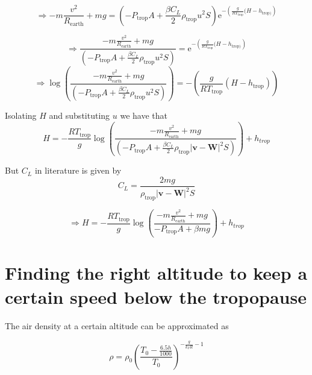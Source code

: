 \documentclass{article}
\renewcommand{\vec}[1]{\boldsymbol{#1}}
\begin{document}
\begin{equation}
\Rightarrow     -m\frac{v^2}{R_{\text{earth}}} +mg= \left(-  P_{\text{trop}}A +\frac{\beta C_L}{2} \rho_{\text{trop}} u^2S\right) \mathrm{e}^{-\left( \frac{g}{RT_{\text{trop}}}(H-h_{\text{trop})} \right)}
\end{equation}

\begin{equation}
  \Rightarrow \frac{-m\frac{v^2}{R_{\text{earth}}} +mg}{\left(-  P_{\text{trop}}A +\frac{\beta C_L}{2} \rho_{\text{trop}} u^2S\right)}=  \mathrm{e}^{-\left( \frac{g}{RT_{\text{trop}}}(H-h_{\text{trop})} \right)}    
\end{equation}
\begin{equation}
  \Rightarrow \log \left(\frac{-m\frac{v^2}{R_{\text{earth}}} +mg}{\left(-  P_{\text{trop}}A +\frac{\beta C_L}{2} \rho_{\text{trop}} u^2S\right)}\right)=  -\left( \frac{g}{RT_{\text{trop}}}(H-h_{\text{trop}}) \right)    
\end{equation}

Isolating $H$ and substituting $u$ we have that
\begin{equation}
    H= - \frac{RT_{\text{trop}}}{g}\log \left(\frac{-m\frac{v^2}{R_{\text{earth}}} +mg}{\left(-  P_{\text{trop}}A +\frac{\beta C_L}{2} \rho_{\text{trop}} |\vec v-\vec W|^2S\right)}\right)+h_{trop}
\end{equation}

 But $C_L$ in literature is given by
\begin{equation}
    C_L= \frac{2mg}{\rho_{\text{trop}} |\vec v-\vec W|^2S}
\end{equation}

\begin{equation}
    \Rightarrow H= - \frac{RT_{\text{trop}}}{g}\log \left(\frac{-m\frac{v^2}{R_{\text{earth}}} +mg}{-  P_{\text{trop}}A +\beta mg }\right)+h_{trop}
\end{equation}

\section{Finding the right altitude to keep a certain speed below the tropopause}

The air density at a certain altitude can be approximated as

\begin{equation}
    \rho= \rho_0 \left(\frac{T_0-\frac{6.5h}{1000}}{T_0}\right)^{-\frac{g}{k_TR}-1}
\end{equation}
\end{document}
